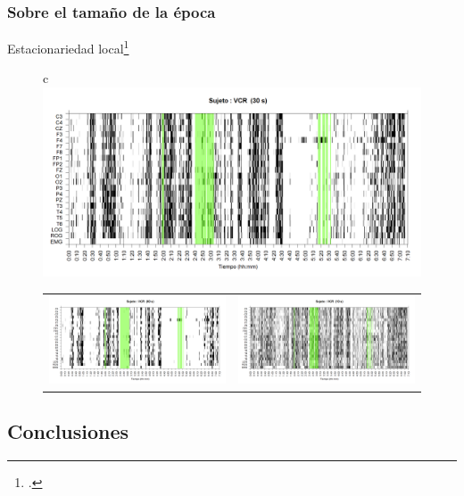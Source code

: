\documentclass{beamer}
\begin{document}

\begin{frame}\frametitle{Sobre el tama\~no de la \'epoca}
{\small Estacionariedad local\footcite{Cohen77}}
\begin{figure}
\centering
\begin{tabular}{c}
\includegraphics[width=0.4\linewidth]
{./p_170511/VCNNS1_est_30.png} \\
\begin{tabular}{cc}
\includegraphics[width=0.4\linewidth]
{./p_170511/VCNNS1_est_60.png} 
&
\includegraphics[width=0.4\linewidth]
{./p_170511/VCNNS1_est_10.png} 
\end{tabular}
\end{tabular}
\end{figure}
\end{frame}


\subsection{Conclusiones}
\end{document}
